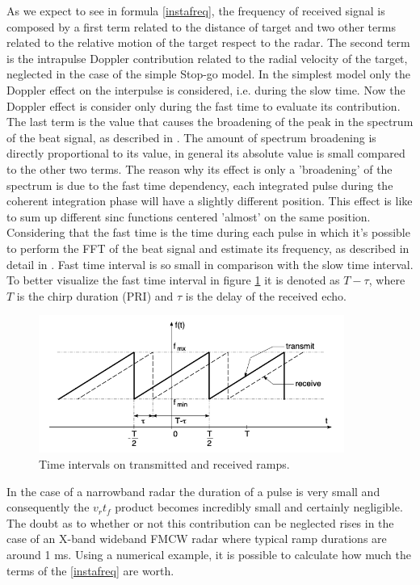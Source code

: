 As we expect to see in formula \ref{instafreq}, the frequency of received signal is composed by a first term related to the distance of target and two other terms related to the relative motion of the target respect to the radar. The second term is the intrapulse Doppler contribution related to the radial velocity of the target, neglected in the case of the simple Stop-go model. In the simplest model only the Doppler effect on the interpulse is considered, i.e. during the slow time. Now the Doppler effect is consider only during the fast time to evaluate its contribution. The last term is the value that causes the broadening of the peak in the spectrum of the beat signal, as described in \cite{chen_chinese}. The amount of spectrum broadening is directly proportional to its value, in general its absolute value is small compared to the other two terms. The reason why its effect is only a 'broadening' of the spectrum is due to the fast time dependency, each integrated pulse during the coherent integration phase will have a slightly different position. This effect is like to sum up different sinc functions centered 'almost' on the same position. Considering that the fast time is the time during each pulse in which it's possible to perform the FFT of the beat signal and estimate its frequency, as described in detail in \cite{2Dprocessing_fmcw}. Fast time interval is so small in comparison with the slow time interval. To better visualize the fast time interval in figure \ref{txandrxrampintervals} it is denoted as $T - \tau$, where $T$ is the chirp duration (PRI) and $\tau$ is the delay of the received echo.

\begin{figure}[h!]
    \centering
    \includegraphics[width=10cm]{Time-frequency analysis-chap3/img/Tx and rx FMCW ramps.png}
    \caption{Time intervals on transmitted and received ramps.}
    \label{txandrxrampintervals}
\end{figure}

 In the case of a narrowband radar the duration of a pulse is very small and consequently the $v_{r}t_{f}$ product becomes incredibly small and certainly negligible. The doubt as to whether or not this contribution can be neglected rises in the case of an X-band wideband FMCW radar where typical ramp durations are around 1 ms.  Using a numerical example, it is possible to calculate how much the terms of the \ref{instafreq} are worth.\\ 
